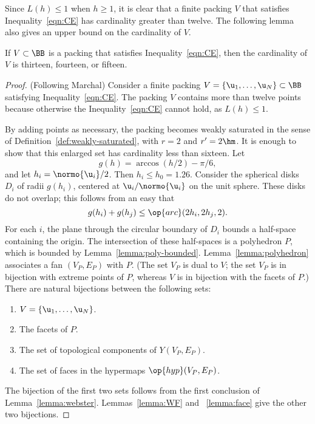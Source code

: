 Since $L(h)\le 1$ when $h\ge1$, it is clear that a finite packing $V$
that satisfies Inequality~\ref{eqn:CE} has cardinality greater than twelve.
The following lemma also gives an upper bound on the cardinality of $V$.

\begin{lemma}[]\label{lemma:13-14}  %
If $V\subset \BB$ is a packing that satisfies
Inequality~\ref{eqn:CE},  then the cardinality of $V$ is thirteen, fourteen, or fifteen.
\end{lemma}


\begin{proof} (Following Marchal)
Consider a finite packing $ V=\{\u_1,\ldots, \u_N\}\subset \BB$ satisfying
Inequality~\ref{eqn:CE}.  The packing $V$ contains more than twelve points because otherwise
the Inequality~\ref{eqn:CE} cannot hold, as $L(h)\le 1$.

By adding points
as necessary, the packing becomes weakly saturated in the sense of
Definition~\ref{def:weakly-saturated}, with $r=2$ and $r'=2\hm$.  It is enough to show
that this enlarged set has cardinality less than sixteen.    Let
\[ %
g(h) = \arccos(h/2) - \pi/6,  %
\] %
and let $h_i =
\normo{ \u_i}/2$.  Then $h_i\le h_0=1.26$.
Consider the spherical disks $D_i$ of radii $g(h_i)$,
centered at $ \u_i/\normo{ \u_i}$ on the unit sphere.  These disks do not overlap; this
follows from an easy 
that
\begin{equation}\label{eqn:disks} 
g(h_i) + g(h_j) \le \op{arc}(2h_i,2h_j,2).%
\end{equation}%
%
For each $i$, the plane through the circular boundary of $D_i$ bounds
a half-space containing the origin.  The intersection of these
half-spaces is a polyhedron $P$, which is bounded by
Lemma~\ref{lemma:poly-bounded}.  Lemma~\ref{lemma:polyhedron}
associates a fan $(V_P,E_P)$ with $P$.  (The set $V_P$ is dual to $
V$; the set $V_P$ is in bijection with extreme points of $P$, whereas $
V$ is in bijection with the facets of $P$.)  There are natural
bijections between the following sets:
\begin{enumerate}\wasitemize  
\item $ V = \{ \u_1,\ldots, \u_N\}$.
\item The  facets of $P$.
\item The set of  topological components of $Y(V_P,E_P)$.
\item The set of faces in the hypermaps $\op{hyp}(V_P,E_P)$.
\end{enumerate}\wasitemize 
The bijection of the first two sets follows from the first conclusion
of Lemma~\ref{lemma:webster}.  Lemmas~\ref{lemma:WF} and
~\ref{lemma:face} give the other two bijections.


\end{proof}

